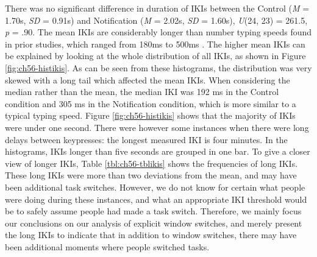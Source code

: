There was no significant difference in duration of IKIs between the Control (\textit{M} = 1.70s, \textit{SD} = 0.91s) and Notification (\textit{M} = 2.02s, \textit{SD} = 1.60s), \textit{U}(24, 23) = 261.5, \textit{p} = .90. The mean IKIs are considerably longer than number typing speeds found in prior studies, which ranged from 180ms to 500ms \citep{Gould2016a}. The higher mean IKIs can be explained by looking at the whole distribution of all IKIs, as shown in Figure \ref{fig:ch56-histikis}. As can be seen from these histograms, the distribution was very skewed with a long tail which affected the mean IKIs. When considering the median rather than the mean, the median IKI was 192 ms in the Control condition and 305 ms in the Notification condition, which is more similar to a typical typing speed. Figure \ref{fig:ch56-histikis} shows that the majority of IKIs were under one second. There were however some instances when there were long delays between keypresses: the longest measured IKI is four minutes. In the histograms, IKIs longer than five seconds are grouped in one bar. To give a closer view of longer IKIs, Table \ref{tbl:ch56-tblikis}  shows the frequencies of long IKIs. These long IKIs were more than two deviations from the mean, and may have been additional task switches. However, we do not know for certain what people were doing during these instances, and what an appropriate IKI threshold would be to safely assume people had made a task switch. Therefore, we mainly focus our conclusions on our analysis of explicit window switches, and merely present the long IKIs to indicate that in addition to window switches, there may have been additional moments where people switched tasks. 

